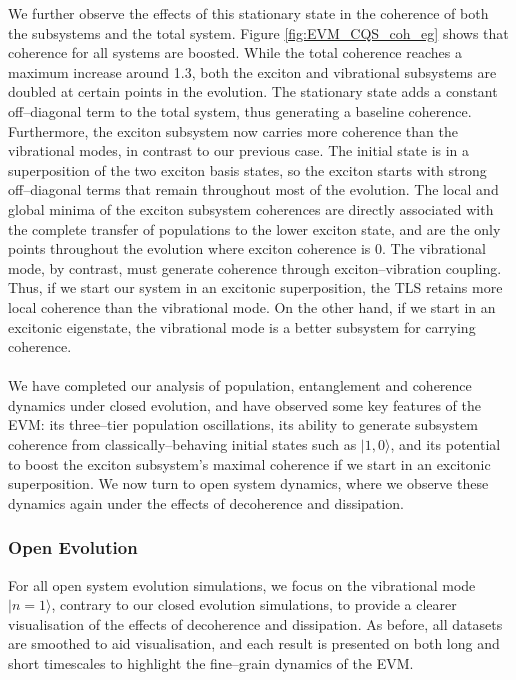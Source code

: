 \documentclass[11pt]{article}
\begin{document}
We further observe the effects of this stationary state in the coherence of both the subsystems and the total system. Figure \ref{fig:EVM_CQS_coh_eg} shows that coherence for all systems are boosted. While the total coherence reaches a maximum increase around 1.3, both the exciton and vibrational subsystems are doubled at certain points in the evolution. The stationary state adds a constant off--diagonal term to the total system, thus generating a baseline coherence. Furthermore, the exciton subsystem now carries more coherence than the vibrational modes, in contrast to our previous case. The initial state is in a superposition of the two exciton basis states, so the exciton starts with strong off--diagonal terms that remain throughout most of the evolution. The local and global minima of the exciton subsystem coherences are directly associated with the complete transfer of populations to the lower exciton state, and are the only points throughout the evolution where exciton coherence is 0. The vibrational mode, by contrast, must generate coherence through exciton--vibration coupling. Thus, if we start our system in an excitonic superposition, the TLS retains more local coherence than the vibrational mode. On the other hand, if we start in an excitonic eigenstate, the vibrational mode is a better subsystem for carrying coherence. \\
\\
We have completed our analysis of population, entanglement and coherence dynamics under closed evolution, and have observed some key features of the EVM: its three--tier population oscillations, its ability to generate subsystem coherence from classically--behaving initial states such as $|1,0\rangle$, and its potential to boost the exciton subsystem's maximal coherence if we start in an excitonic superposition. We now turn to open system dynamics, where we observe these dynamics again under the effects of decoherence and dissipation.
\subsubsection{Open Evolution}

For all open system evolution simulations, we focus on the vibrational mode $|n=1\rangle$, contrary to our closed evolution simulations, to provide a clearer visualisation of the effects of decoherence and dissipation. As before, all datasets are smoothed to aid visualisation, and each result is presented on both long and short timescales to highlight the fine--grain dynamics of the EVM.
\end{document}
